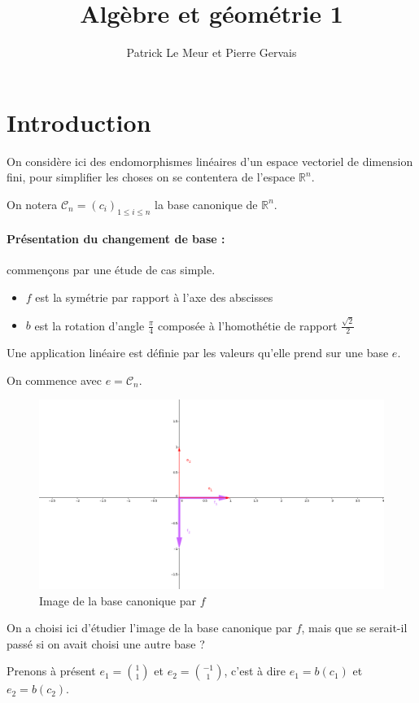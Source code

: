 \documentclass[]{article}
\title{Algèbre et géométrie 1}
\author{Patrick Le Meur et Pierre Gervais}
\theoremstyle{remark}
\theoremstyle{definition}
\begin{document}
	\section{Introduction}
		On considère ici des endomorphismes linéaires d'un espace vectoriel de dimension fini, pour simplifier les choses on se contentera de l'espace $\mathbb{R}^n$.
		
		On notera $\mathcal{C}_n=(c_i)_{1 \leqslant i \leqslant n}$ la base canonique de $\mathbb{R}^n$.
		
		\paragraph{Présentation du changement de base :}
		
		commençons par une étude de cas simple.
		\begin{itemize}
			\item $f$ est la symétrie par rapport à l'axe des abscisses
			\item $b$ est la rotation d'angle $\frac{\pi}{4}$ composée à l'homothétie de rapport $\frac{\sqrt{2}}{2}$
		\end{itemize}
		
		
		Une application linéaire est définie par les valeurs qu'elle prend sur une base $e$.

		On commence avec $e=\mathcal{C}_n$.
		
		\begin{figure}[h!]
			\centering
			\includegraphics[width=350pt]{Img1.png}
			\caption{Image de la base canonique par $f$}
		\end{figure}

		On a choisi ici d'étudier l'image de la base canonique par $f$, mais que se serait-il passé si on avait choisi une autre base ?
		
		Prenons à présent $e_1=\binom{1}{1}$ et $e_2=\binom{-1}{1}$, c'est à dire $e_1=b(c_1)$ et $e_2=b(c_2)$.
		
\end{document}

